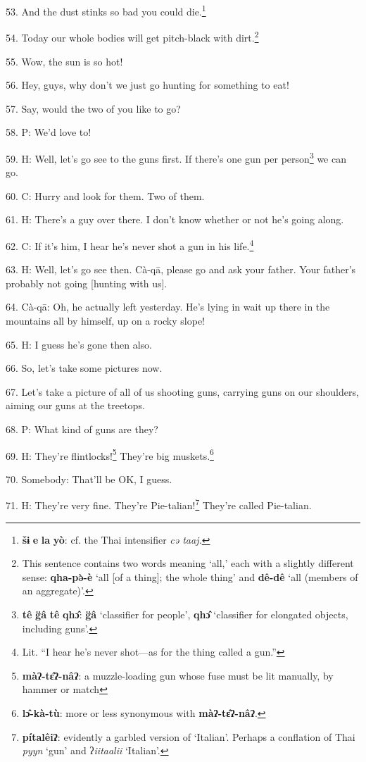 53. And the dust stinks so bad you could die.\footnote{\textbf{šɨ} \textbf{e} \textbf{la} \textbf{yò}: cf. the Thai intensifier\textit{\textbf{ }}\textit{cə taaj.}}

54. Today our whole bodies will get pitch-black with dirt.\footnote{This sentence contains two words meaning `all,' each with a slightly different sense: \textbf{qha-pə̀-è} `all [of a thing]; the whole thing' and \textbf{dê-dê} `all (members of an aggregate)'.}

55. Wow, the sun is so hot!

56. Hey, guys, why don't we just go hunting for something to eat!

57. Say, would the two of you like to go?

58. P: We'd love to!

59. H: Well, let's go see to the guns first. If there's one gun per person\footnote{\textbf{tê} \textbf{g̈â} \textbf{tê} \textbf{qhɔ̂}: \textbf{g̈â} `classifier for people', \textbf{qhɔ̂} `classifier for elongated objects, including guns'.}
we can go.

60. C: Hurry and look for them. Two of them.

61. H: There's a guy over there. I don't know whether or not he's going along.

62. C: If it's him, I hear he's never shot a gun in his life.\footnote{Lit. ``I hear he's never shot---as for the thing called a gun.''}

63. H: Well, let's go see then. Cà-qā, please go and ask your father. Your father's
probably not going [hunting with us].

64. Cà-qā: Oh, he actually left yesterday. He's lying in wait up there in the
mountains all by himself, up on a rocky slope!

65. H: I guess he's gone then also.

66. So, let's take some pictures now.

67. Let's take a picture of all of us shooting guns, carrying guns on our shoulders,
aiming our guns at the treetops.

68. P: What kind of guns are they?

69. H: They're flintlocks!\footnote{\textbf{màʔ-tɛ̂ʔ-nâʔ}: a muzzle-loading gun whose fuse must be lit manually, by hammer or match} They're big muskets.\footnote{\textbf{lɔ̂-kà-tù}: more or less synonymous with \textbf{màʔ-tɛ̂ʔ-nâʔ}.}

70. Somebody: That'll be OK, I guess.

71. H: They're very fine. They're Pie-talian!\footnote{\textbf{pítalêiʔ}: evidently a garbled version of `Italian'. Perhaps a conflation of Thai \textit{pyyn} `gun' and ʔ\textit{iitaalii} `Italian'.} They're called Pie-talian.

